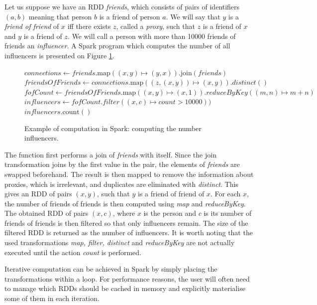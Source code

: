 \begin{exmp}
Let us suppose we have an RDD \emph{friends}, which consists of pairs of identifiers $(a, b)$ meaning that person $b$ is a friend of person $a$. We will say that $y$ is a \emph{friend of friend} of $x$ iff there exists $z$, called a \emph{proxy}, such that $z$ is a friend of $x$ and $y$ is a friend of $z$. We will call a person with more than 10000 friends of friends an \emph{influencer}. A Spark program which computes the number of all influencers is presented on Figure \ref{ex:sparkfof}.

\begin{figure}[!htbp]
\begin{codebox}
  \li $\textit{connections} \leftarrow \textit{friends}.\text{map}((x, y) \mapsto (y, x)).\text{join}(\textit{friends})$
  \li $\textit{friendsOfFriends} \leftarrow \textit{connections}.\text{map}((z, (x, y)) \mapsto (x, y)).distinct()$ 
  \li $\textit{fofCount} \leftarrow \textit{friendsOfFriends}.\text{map}((x, y) \mapsto (x, 1)).reduceByKey((m, n) \mapsto m+n)$
  \li $\textit{influencers} \leftarrow fofCount.filter((x, c) \mapsto count > 10000))$
  \li \Return $\textit{influencers}.\text{count}()$
\end{codebox}
\caption{Example of computation in Spark: computing the number influencers.}\label{ex:sparkfof}
\end{figure}

The  function first performs a join of \emph{friends} with itself. Since the join transformation joins by the first value in the pair, the elements of \emph{friends} are swapped beforehand. The result is then mapped to remove the information about proxies, which is irrelevant, and duplicates are eliminated with \emph{distinct}. This gives an RDD of pairs $(x, y)$, such that $y$ is a friend of friend of $x$. For each $x$, the number of friends of friends is then computed using \emph{map} and \emph{reduceByKey}. The obtained RDD of pairs $(x, c)$, where $x$ is the person and $c$ is its number of friends of friends is then filtered so that only influencers remain. The size of the filtered RDD is returned as the number of influencers. It is worth noting that the used transformations \emph{map, filter, distinct} and \emph{reduceByKey} are not actually executed until the action \emph{count} is performed.

Iterative computation can be achieved in Spark by simply placing the transformations within a loop. For performance reasons, the user will often need to manage which RDDs should be cached in memory and explicitly materialise some of them in each iteration.
\end{exmp}

